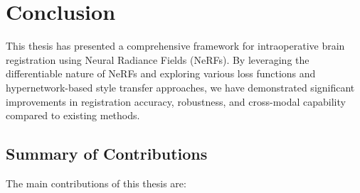 \chapter{Conclusion}

This thesis has presented a comprehensive framework for intraoperative brain registration using Neural Radiance Fields (NeRFs). By leveraging the differentiable nature of NeRFs and exploring various loss functions and hypernetwork-based style transfer approaches, we have demonstrated significant improvements in registration accuracy, robustness, and cross-modal capability compared to existing methods.

\section{Summary of Contributions}

The main contributions of this thesis are:

